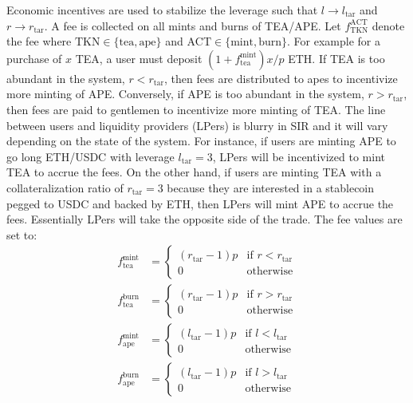 \documentclass[journal,letterpaper,oneside,onecolumn,12pt]{IEEEtran}
\begin{document}
	Economic incentives are used to stabilize the leverage such that $l\rightarrow l_\textrm{tar}$ and $r\rightarrow r_\textrm{tar}$.
	A fee is collected on all mints and burns of TEA/APE. Let $f_\textrm{TKN}^\textrm{ACT}$ denote the fee where $\textrm{TKN}\in\{\textrm{tea},\textrm{ape}\}$ and $\textrm{ACT}\in\{\textrm{mint},\textrm{burn}\}$.  For example for a purchase of $x$ TEA, a user must deposit $(1+f_\textrm{tea}^\textrm{mint})x/p$ ETH. If TEA is too abundant in the system, $r<r_\textrm{tar}$, then fees are distributed to apes to incentivize more minting of APE. Conversely, if APE is too abundant in the system, $r>r_\textrm{tar}$, then fees are paid to gentlemen to incentivize more minting of TEA. The line between users and liquidity providers (LPers) is blurry in SIR and it will vary depending on the state of the system. For instance, if users are minting APE to go long ETH/USDC with leverage $l_\textrm{tar}=3$, LPers will be incentivized to mint TEA to accrue the fees. On the other hand, if users are minting TEA with a collateralization ratio of $r_\textrm{tar}=3$ because they are interested in a stablecoin pegged to USDC and backed by ETH, then LPers will mint APE to accrue the fees. Essentially LPers will take the opposite side of the trade.
	The fee values are set to:
	\begin{align}
		f_\textrm{tea}^\textrm{mint} &= \begin{cases}
			(r_\textrm{tar}-1)p & \text{if }r<r_\textrm{tar} \\
			0 & \text{otherwise}
		\end{cases} \label{eq:fee:tea_mint} \\
		f_\textrm{tea}^\textrm{burn} &= \begin{cases}
			(r_\textrm{tar}-1)p & \text{if }r>r_\textrm{tar} \\
			0 & \text{otherwise}
		\end{cases} \label{eq:fee:tea_burn} \\
		f_\textrm{ape}^\textrm{mint} &= \begin{cases}
			(l_\textrm{tar}-1)p & \text{if }l<l_\textrm{tar} \\
			0 & \text{otherwise}
		\end{cases} \\
		f_\textrm{ape}^\textrm{burn} &= \begin{cases}
			(l_\textrm{tar}-1)p & \text{if }l>l_\textrm{tar} \\
			0 & \text{otherwise}
		\end{cases} \label{eq:fee:ape_burn}
	\end{align}
\end{document}
